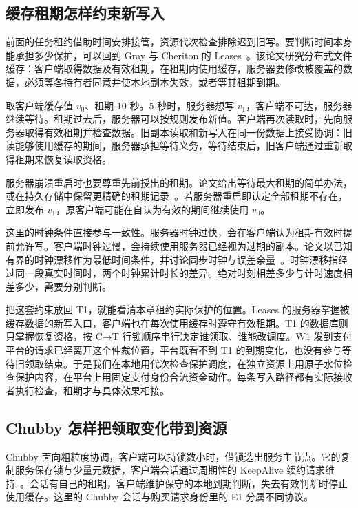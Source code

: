 \subsection*{缓存租期怎样约束新写入}

前面的任务租约借助时间安排接管，资源代次检查排除迟到旧写。要判断时间本身能承担多少保护，可以回到 Gray 与 Cheriton 的 Leases~\cite{leases}。该论文研究分布式文件缓存：客户端取得数据及有效租期，在租期内使用缓存，服务器要修改被覆盖的数据，必须等各持有者同意并使本地副本失效，或者等其租期到期。

取客户端缓存值 \(v_0\)、租期 10 秒。5 秒时，服务器想写 \(v_1\)，客户端不可达，服务器继续等待。租期过去后，服务器可以按规则发布新值。客户端再次读取时，先向服务器取得有效租期并检查数据。旧副本读取和新写入在同一份数据上接受协调：旧读能够使用缓存的期间，服务器承担等待义务，等待结束后，旧客户端通过重新取得租期来恢复读取资格。

服务器崩溃重启时也要尊重先前授出的租期。论文给出等待最大租期的简单办法，或在持久存储中保留更精确的租期记录~\cite{leases}。若服务器重启即认定全部租期不存在，立即发布 \(v_1\)，原客户端可能在自认为有效的期间继续使用 \(v_0\)。

这里的时钟条件直接参与一致性。服务器时钟过快，会在客户端认为租期有效时提前允许写。客户端时钟过慢，会持续使用服务器已经视为过期的副本。论文以已知有界的时钟漂移作为最低时间条件，并讨论同步时钟与误差余量~\cite{leases}。时钟漂移指经过同一段真实时间时，两个时钟累计时长的差异。绝对时刻相差多少与计时速度相差多少，需要分别判断。


把这套约束放回 T1，就能看清本章租约实际保护的位置。Leases 的服务器掌握被缓存数据的新写入口，客户端也在每次使用缓存时遵守有效租期。T1 的数据库则只掌握恢复资格，按 C→T 行锁顺序串行决定谁领取、谁能改调度。W1 发到支付平台的请求已经离开这个仲裁位置，平台既看不到 T1 的到期变化，也没有参与等待旧领取结束。于是我们在本地用代次检查保护调度，在独立资源上用原子水位检查保护内容，在平台上用固定支付身份合流资金动作。每条写入路径都有实际接收者执行检查，租期才与具体效果相接。

\subsection*{Chubby 怎样把领取变化带到资源}

Chubby 面向粗粒度协调，客户端可以持锁数小时，借锁选出服务主节点。它的复制服务保存锁与少量元数据，客户端会话通过周期性的 KeepAlive 续约请求维持~\cite{chubby}。会话有自己的租期，客户端维护保守的本地到期判断，失去有效判断时停止使用缓存。这里的 Chubby 会话与购买请求身份里的 E1 分属不同协议。

